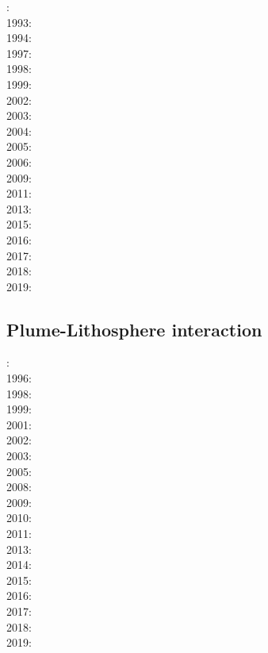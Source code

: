: \cite{kell91}\\
1993: \cite{keki93}\\
1994: \cite{nasf94}\cite{fari94}\cite{leka94b}\cite{hayu94}\\
1997: \cite{vank97}\cite{keki97}\\
1998: \cite{thta98}\\
1999: \cite{lays99}\\
2002: \cite{falt02}\cite{dagl02}\cite{nitg02}\cite{tagh02}\\
2003: \cite{safa03}\\
2004: \cite{goch04}\\
2005: \cite{tagu05}\\
2006: \cite{isst06}\cite{liva06a}\cite{liva06b}\cite{zhon06}\cite{mita06}\cite{nokm06}\cite{qufo06}
      \cite{keso06}\\
2009: \cite{vavl09}\cite{bogj09}\cite{faho09}\\
2011: \cite{toyu11}\cite{talz11}\cite{burk11}\cite{memm11}\cite{dalt11}\cite{tree11}\\
2013: \cite{dagm13}\cite{madd13}\cite{ande13}\\
2015: \cite{daso15}\cite{hafg15}\\
2016: \cite{kili16}\\
2017: \cite{zhli17}\\
2018: \cite{dacc18}\\
2019: \cite{argc19}

\subsection*{Plume-Lithosphere interaction}

: \cite{rich94}\cite{fari94}\\
1996: \cite{zhgm96}\\
1998: \cite{bisp98}\cite{most98}\\
1999: \cite{most99}\\
2001: \cite{vapy01}\\
2002: \cite{foul02}\\
2003: \cite{vazh03}\\
2005: \cite{bugu05}\cite{fasa05}\\
2008: \cite{uegs08}\cite{slee08}\\
2009: \cite{bucl09}\cite{zhgy09}\cite{baiv10}\cite{tabs09}\cite{maml09}\\
2010: \cite{fabl10}\\
2011: \cite{sosk11}\\
2013: \cite{bemm12}\cite{brps13}\\
2014: \cite{buge14}\cite{gery14b}\cite{buto14}\cite{buit14}\cite{leli14}\\
2015: \cite{bemm15}\cite{gesb15}\cite{kocb15}\cite{meds15}\cite{lile15}\\
2016: \cite{fige16}\cite{gadb16}\cite{kobc16}\\
2017: \cite{bahf17}\cite{brsg17}\cite{bahf17}\cite{bekb17}\cite{kocb17}\\
2018: \cite{daga18}\\
2019: \cite{kobg19}

